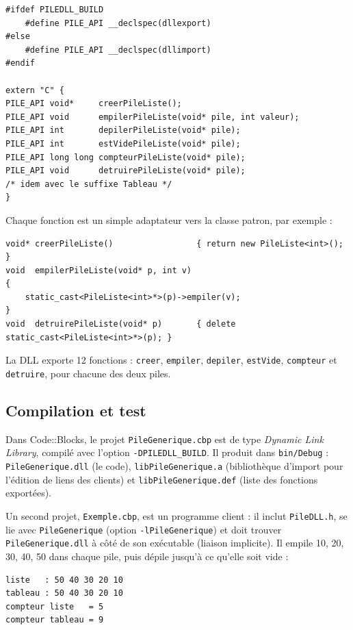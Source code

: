 \documentclass[11pt,a4paper]{article}
\begin{document}
\begin{lstlisting}
#ifdef PILEDLL_BUILD
    #define PILE_API __declspec(dllexport)
#else
    #define PILE_API __declspec(dllimport)
#endif

extern "C" {
PILE_API void*     creerPileListe();
PILE_API void      empilerPileListe(void* pile, int valeur);
PILE_API int       depilerPileListe(void* pile);
PILE_API int       estVidePileListe(void* pile);
PILE_API long long compteurPileListe(void* pile);
PILE_API void      detruirePileListe(void* pile);
/* idem avec le suffixe Tableau */
}
\end{lstlisting}

Chaque fonction est un simple adaptateur vers la classe patron, par exemple :

\begin{lstlisting}
void* creerPileListe()                 { return new PileListe<int>(); }
void  empilerPileListe(void* p, int v)
{
    static_cast<PileListe<int>*>(p)->empiler(v);
}
void  detruirePileListe(void* p)       { delete static_cast<PileListe<int>*>(p); }
\end{lstlisting}

La DLL exporte 12 fonctions : \texttt{creer}, \texttt{empiler}, \texttt{depiler}, \texttt{estVide}, \texttt{compteur} et \texttt{detruire}, pour chacune des deux piles.

\subsection{Compilation et test}

Dans Code\string:\string:Blocks, le projet \texttt{PileGenerique.cbp} est de type \emph{Dynamic Link Library}, compilé avec l'option \texttt{-DPILEDLL\_BUILD}. Il produit dans \texttt{bin/Debug} : \texttt{PileGenerique.dll} (le code), \texttt{libPileGenerique.a} (bibliothèque d'import pour l'édition de liens des clients) et \texttt{libPileGenerique.def} (liste des fonctions exportées).

Un second projet, \texttt{Exemple.cbp}, est un programme client : il inclut \texttt{PileDLL.h}, se lie avec \texttt{PileGenerique} (option \texttt{-lPileGenerique}) et doit trouver \texttt{PileGenerique.dll} à côté de son exécutable (liaison implicite). Il empile 10, 20, 30, 40, 50 dans chaque pile, puis dépile jusqu'à ce qu'elle soit vide :

\begin{lstlisting}
liste   : 50 40 30 20 10
tableau : 50 40 30 20 10
compteur liste   = 5
compteur tableau = 9
\end{lstlisting}
\end{document}
